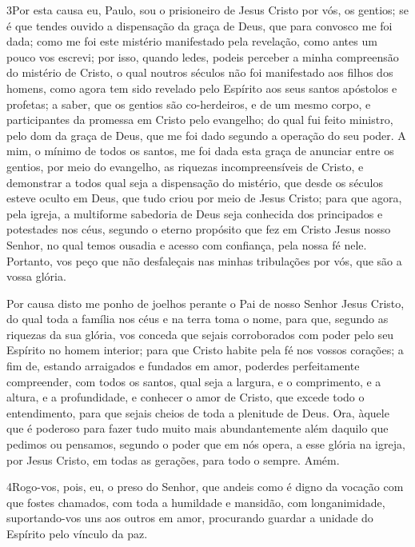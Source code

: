 \lettrine{3} Por esta causa eu, Paulo, sou o prisioneiro de
Jesus Cristo por vós, os gentios; se é que tendes ouvido a
dispensação da graça de Deus, que para convosco me foi dada;
como me foi este mistério manifestado pela revelação, como antes
um pouco vos escrevi; por isso, quando ledes, podeis perceber a
minha compreensão do mistério de Cristo, o qual noutros séculos
não foi manifestado aos filhos dos homens, como agora tem sido
revelado pelo Espírito aos seus santos apóstolos e profetas; a
saber, que os gentios são co-herdeiros, e de um mesmo corpo, e
participantes da promessa em Cristo pelo evangelho; do qual fui
feito ministro, pelo dom da graça de Deus, que me foi dado segundo a
operação do seu poder. A mim, o mínimo de todos os santos, me
foi dada esta graça de anunciar entre os gentios, por meio do
evangelho, as riquezas incompreensíveis de Cristo, e demonstrar
a todos qual seja a dispensação do mistério, que desde os séculos
esteve oculto em Deus, que tudo criou por meio de Jesus Cristo;
para que agora, pela igreja, a multiforme sabedoria de Deus
seja conhecida dos principados e potestades nos céus, segundo
o eterno propósito que fez em Cristo Jesus nosso Senhor, no
qual temos ousadia e acesso com confiança, pela nossa fé nele.
Portanto, vos peço que não desfaleçais nas minhas tribulações
por vós, que são a vossa glória.

Por causa disto me ponho de joelhos perante o Pai de nosso Senhor
Jesus Cristo, do qual toda a família nos céus e na terra toma
o nome, para que, segundo as riquezas da sua glória, vos
conceda que sejais corroborados com poder pelo seu Espírito no homem
interior; para que Cristo habite pela fé nos vossos corações;
a fim de, estando arraigados e fundados em amor, poderdes
perfeitamente compreender, com todos os santos, qual seja a largura,
e o comprimento, e a altura, e a profundidade, e conhecer o
amor de Cristo, que excede todo o entendimento, para que sejais
cheios de toda a plenitude de Deus. Ora, àquele que é
poderoso para fazer tudo muito mais abundantemente além daquilo que
pedimos ou pensamos, segundo o poder que em nós opera, a esse
glória na igreja, por Jesus Cristo, em todas as gerações, para todo
o sempre. Amém.

\medskip

\lettrine{4} Rogo-vos, pois, eu, o preso do Senhor, que andeis
como é digno da vocação com que fostes chamados, com toda a
humildade e mansidão, com longanimidade, suportando-vos uns aos
outros em amor, procurando guardar a unidade do Espírito pelo
vínculo da paz.

